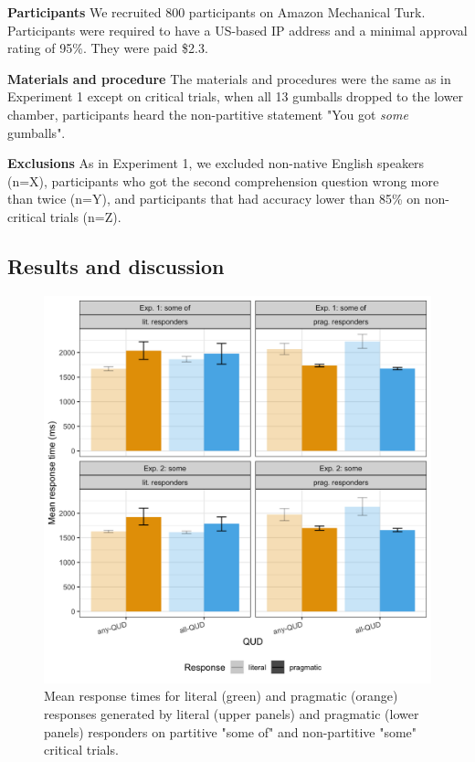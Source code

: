 \documentclass[10pt,letterpaper]{article}
\begin{document}
\noindent \textbf{Participants} We recruited 800 participants on Amazon Mechanical Turk. Participants were required to have a US-based IP address and a minimal approval rating of 95\%. They were paid \$2.3.

\noindent \textbf{Materials and procedure} The materials and procedures were the same as in Experiment 1 except on critical trials, when all 13 gumballs dropped to the lower chamber, participants heard the non-partitive statement "You got \textit{some} gumballs".

\noindent \textbf{Exclusions} As in Experiment 1, we excluded non-native English speakers (n=X), participants who got the second comprehension question wrong more than twice (n=Y), and participants that had accuracy lower than 85\% on non-critical trials (n=Z).

\subsection{Results and discussion}

\begin{figure}
  \includegraphics[width=\columnwidth]{plots/responsetimes.png}
  \caption{Mean response times for literal (green) and pragmatic (orange) responses generated by literal (upper panels) and pragmatic (lower panels) responders on partitive "some of" and non-partitive "some" critical trials. \label{fig:responsetimes}}
\end{figure}
\end{document}

